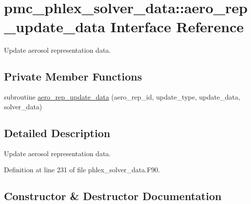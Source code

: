 \hypertarget{interfacepmc__phlex__solver__data_1_1aero__rep__update__data}{}\section{pmc\+\_\+phlex\+\_\+solver\+\_\+data\+:\+:aero\+\_\+rep\+\_\+update\+\_\+data Interface Reference}
\label{interfacepmc__phlex__solver__data_1_1aero__rep__update__data}


Update aerosol representation data.  


\subsection*{Private Member Functions}
\begin{DoxyCompactItemize}
\item 
subroutine \mbox{\hyperlink{interfacepmc__phlex__solver__data_1_1aero__rep__update__data_aaa49abdb61aa93d3b85e3336f20a4187}{aero\+\_\+rep\+\_\+update\+\_\+data}} (aero\+\_\+rep\+\_\+id, update\+\_\+type, update\+\_\+data, solver\+\_\+data)
\end{DoxyCompactItemize}


\subsection{Detailed Description}
Update aerosol representation data. 

Definition at line 231 of file phlex\+\_\+solver\+\_\+data.\+F90.



\subsection{Constructor \& Destructor Documentation}
\mbox{\label{interfacepmc__phlex__solver__data_1_1aero__rep__update__data_aaa49abdb61aa93d3b85e3336f20a4187}} 
